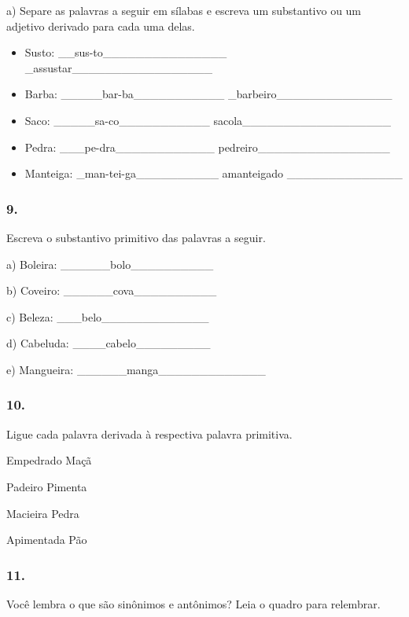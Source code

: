 a) Separe as palavras a seguir em sílabas e escreva um substantivo ou um
adjetivo derivado para cada uma delas.

\begin{itemize}
\item
  Susto: \_\_sus-to\_\_\_\_\_\_\_\_\_\_\_\_\_\_\_
  \_assustar\_\_\_\_\_\_\_\_\_\_\_\_\_\_\_\_\_
\item
  Barba: \_\_\_\_\_bar-ba\_\_\_\_\_\_\_\_\_\_\_
  \_barbeiro\_\_\_\_\_\_\_\_\_\_\_\_\_\_
\item
  Saco: \_\_\_\_\_sa-co\_\_\_\_\_\_\_\_\_\_\_
  sacola\_\_\_\_\_\_\_\_\_\_\_\_\_\_\_\_\_\_
\item
  Pedra: \_\_\_pe-dra\_\_\_\_\_\_\_\_\_\_\_\_
  pedreiro\_\_\_\_\_\_\_\_\_\_\_\_\_\_\_\_
\item
  Manteiga: \_man-tei-ga\_\_\_\_\_\_\_\_\_\_ amanteigado
  \_\_\_\_\_\_\_\_\_\_\_\_\_\_
\end{itemize}

\subsubsection{9. }\label{section-8}

Escreva o substantivo primitivo das palavras a seguir.

a) Boleira: \_\_\_\_\_\_bolo\_\_\_\_\_\_\_\_\_\_

b) Coveiro: \_\_\_\_\_\_cova\_\_\_\_\_\_\_\_\_\_

c) Beleza: \_\_\_belo\_\_\_\_\_\_\_\_\_\_\_\_\_

d) Cabeluda: \_\_\_\_cabelo\_\_\_\_\_\_\_\_\_

e) Mangueira: \_\_\_\_\_\_manga\_\_\_\_\_\_\_\_\_\_\_\_\_

\subsubsection{10. }\label{section-9}

Ligue cada palavra derivada à respectiva palavra primitiva.

Empedrado Maçã

Padeiro Pimenta

Macieira Pedra

Apimentada Pão

\subsubsection{11. }\label{section-10}

Você lembra o que são sinônimos e antônimos? Leia o quadro para
relembrar.

